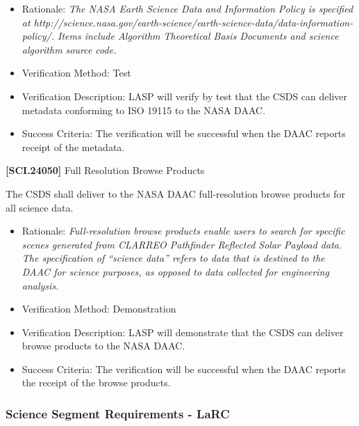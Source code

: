 \begin{itemize}
\item{} Rationale: \emph{The NASA Earth Science Data and Information Policy is specified at http:\slash \slash science.nasa.gov\slash earth-science\slash earth-science-data\slash data-information-policy\slash . Items include Algorithm Theoretical Basis Documents and science algorithm source code.}

\item{} Verification Method: Test

\item{} Verification Description: \gls{LASP} will verify by \gls{test} that the \gls{CSDS} can deliver metadata conforming to ISO 19115 to the NASA \gls{DAAC}.

\item{} Success Criteria: The verification will be successful when the \gls{DAAC} reports receipt of the metadata.

\end{itemize}

\textbf{[SCI.24050]} Full Resolution Browse Products

The \gls{CSDS} shall deliver to the NASA \gls{DAAC} full-resolution browse products for all science data.

\begin{itemize}
\item{} Rationale: \emph{Full-resolution browse products enable users to search for specific scenes generated from CLARREO Pathfinder Reflected Solar Payload data. The specification of ``science data'' refers to data that is destined to the DAAC for science purposes, as opposed to data collected for engineering analysis.}

\item{} Verification Method: Demonstration

\item{} Verification Description: \gls{LASP} will demonstrate that the \gls{CSDS} can deliver browse products to the NASA \gls{DAAC}.

\item{} Success Criteria: The verification will be successful when the \gls{DAAC} reports the receipt of the browse products.

\end{itemize}

\subsubsection{Science Segment Requirements - LaRC}
\label{sciencesegmentrequirements-larc}

